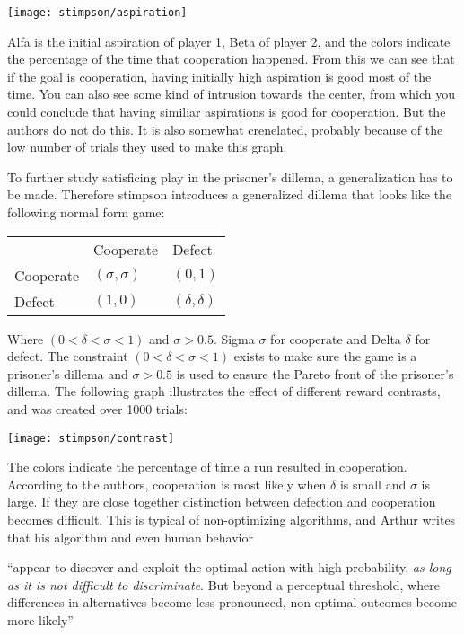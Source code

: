 \texttt{[image: stimpson/aspiration]}

Alfa is the initial aspiration of player 1, Beta of player 2, and the colors
indicate the percentage of the time that cooperation happened. From this we can
see that if the goal is cooperation, having initially high aspiration is good
most of the time. You can also see some kind of intrusion towards the center,
from which you could conclude that having similiar aspirations is good for
cooperation. But the authors do not do this. It is also somewhat crenelated,
probably because of the low number of trials they used to make this graph.

To further study satisficing play in the prisoner's dillema, a generalization
has to be made. Therefore stimpson introduces a generalized dillema that looks
like the following normal form game:
\begin{tabular}{lll}
            & Cooperate   & Defect \\
  Cooperate & $(\sigma,\sigma)$     & $(0,1)$  \\
  Defect    & $(1,0)$     & $(\delta,\delta)$  \\
\end{tabular}
Where $(0<\delta<\sigma<1)$ and $\sigma>0.5$. Sigma $\sigma$ for cooperate and
Delta $\delta$ for defect. The constraint $(0<\delta<\sigma<1)$ exists to make
sure the game is a prisoner's dillema and $\sigma>0.5$ is used to ensure the
Pareto front of the prisoner's dillema.
The following graph illustrates the effect of different reward contrasts,
and was created over 1000 trials:

\noindent
\texttt{[image: stimpson/contrast]}

The colors indicate the percentage of time a run resulted in cooperation.
According to the authors, cooperation is most likely when $\delta$ is small
and $\sigma$ is large. If they are close together distinction between 
defection and cooperation becomes difficult. This is typical of non-optimizing
algorithms, and Arthur writes that his algorithm and even human behavior


``appear to discover and exploit the optimal action with high probability,
\emph{as long as it is not difficult to discriminate}. But beyond a perceptual
threshold, where differences in alternatives become less pronounced,
non-optimal outcomes become more likely'' \citep{arthur}

